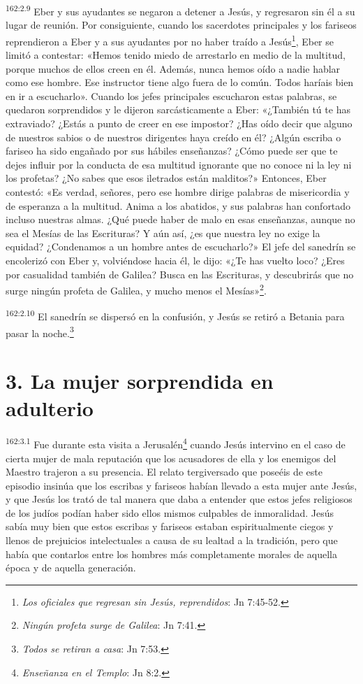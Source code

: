 \par 
\textsuperscript{162:2.9} Eber y sus ayudantes se negaron a detener a Jesús, y regresaron sin él a su lugar de reunión. Por consiguiente, cuando los sacerdotes principales y los fariseos reprendieron a Eber y a sus ayudantes por no haber traído a Jesús\footnote{\textit{Los oficiales que regresan sin Jesús, reprendidos}: Jn 7:45-52.}, Eber se limitó a contestar: «Hemos tenido miedo de arrestarlo en medio de la multitud, porque muchos de ellos creen en él. Además, nunca hemos oído a nadie hablar como ese hombre. Ese instructor tiene algo fuera de lo común. Todos haríais bien en ir a escucharlo». Cuando los jefes principales escucharon estas palabras, se quedaron sorprendidos y le dijeron sarcásticamente a Eber: «¿También tú te has extraviado? ¿Estás a punto de creer en ese impostor? ¿Has oído decir que alguno de nuestros sabios o de nuestros dirigentes haya creído en él? ¿Algún escriba o fariseo ha sido engañado por sus hábiles enseñanzas? ¿Cómo puede ser que te dejes influir por la conducta de esa multitud ignorante que no conoce ni la ley ni los profetas? ¿No sabes que esos iletrados están malditos?» Entonces, Eber contestó: «Es verdad, señores, pero ese hombre dirige palabras de misericordia y de esperanza a la multitud. Anima a los abatidos, y sus palabras han confortado incluso nuestras almas. ¿Qué puede haber de malo en esas enseñanzas, aunque no sea el Mesías de las Escrituras? Y aún así, ¿es que nuestra ley no exige la equidad? ¿Condenamos a un hombre antes de escucharlo?» El jefe del sanedrín se encolerizó con Eber y, volviéndose hacia él, le dijo: «¿Te has vuelto loco? ¿Eres por casualidad también de Galilea? Busca en las Escrituras, y descubrirás que no surge ningún profeta de Galilea, y mucho menos el Mesías»\footnote{\textit{Ningún profeta surge de Galilea}: Jn 7:41.}.

\par 
\textsuperscript{162:2.10} El sanedrín se dispersó en la confusión, y Jesús se retiró a Betania para pasar la noche.\footnote{\textit{Todos se retiran a casa}: Jn 7:53.}

\section*{3. La mujer sorprendida en adulterio}
\par 
\textsuperscript{162:3.1} Fue durante esta visita a Jerusalén\footnote{\textit{Enseñanza en el Templo}: Jn 8:2.} cuando Jesús intervino en el caso de cierta mujer de mala reputación que los acusadores de ella y los enemigos del Maestro trajeron a su presencia. El relato tergiversado que poseéis de este episodio insinúa que los escribas y fariseos habían llevado a esta mujer ante Jesús, y que Jesús los trató de tal manera que daba a entender que estos jefes religiosos de los judíos podían haber sido ellos mismos culpables de inmoralidad. Jesús sabía muy bien que estos escribas y fariseos estaban espiritualmente ciegos y llenos de prejuicios intelectuales a causa de su lealtad a la tradición, pero que había que contarlos entre los hombres más completamente morales de aquella época y de aquella generación.

